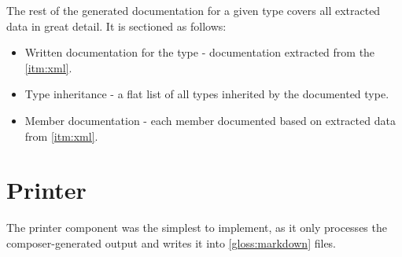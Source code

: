 The rest of the generated documentation for a given type covers all extracted data in great detail. It is sectioned as follows:
\begin{itemize}
    \item Written documentation for the type - documentation extracted from the \ref{itm:xml}.
    \item Type inheritance - a flat list of all types inherited by the documented type.
    \item Member documentation - each member documented based on extracted data from \ref{itm:xml}.
\end{itemize}

\section{Printer}

The printer component was the simplest to implement, as it only processes the composer-generated output and writes it into \ref{gloss:markdown} files.